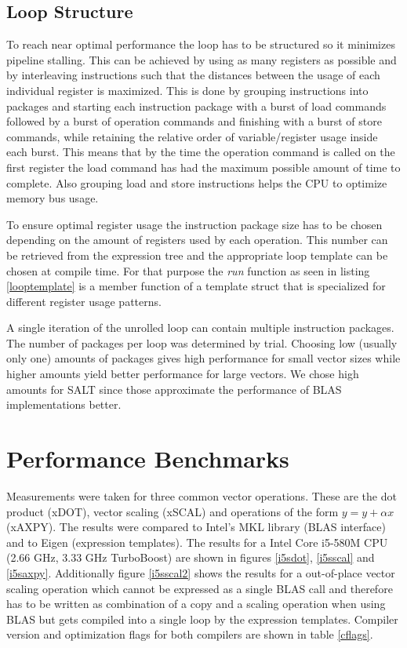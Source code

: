\documentclass[12pt]{article}
\begin{document}
\subsection{Loop Structure}
To reach near optimal performance the loop has to be structured so it minimizes
pipeline stalling. This can be achieved by using as many registers as possible
and by interleaving instructions such that the distances between the usage of
each individual register is maximized. This is done by grouping instructions into packages
and starting each instruction package with a burst of load commands followed by a burst of operation commands and
finishing with a burst of store commands, while retaining the relative order of
variable/register usage inside each burst. This means that by the time the
operation command is called on the first register the load command has had the maximum
possible amount of time to complete. Also grouping load and store instructions
helps the CPU to optimize memory bus usage.

To ensure optimal register usage the instruction package size has to be chosen depending
on the amount of registers used by each operation. This number can be retrieved
from the expression tree and the appropriate loop template can be chosen at compile
time. For that purpose the \emph{run} function as seen in listing \ref{looptemplate}
is a member function of a template struct that is specialized for different
register usage patterns.

A single iteration of the unrolled loop can contain multiple instruction packages.
The number of packages per loop was determined by trial. Choosing low (usually
only one) amounts of packages gives high performance for small vector sizes while
higher amounts yield better performance for large vectors. We chose high amounts for SALT
since those approximate the performance of BLAS implementations better.

\section{Performance Benchmarks}
Measurements were taken for three common vector operations. These are the dot product
(xDOT), vector scaling (xSCAL) and operations of the form $y = y + \alpha x$
(xAXPY). The results were compared to Intel's MKL library (BLAS interface) and
to Eigen (expression templates). The results for a Intel Core i5-580M CPU (2.66 GHz,
3.33 GHz TurboBoost) are shown in figures \ref{i5sdot}, \ref{i5sscal} and \ref{i5saxpy}.
Additionally figure \ref{i5sscal2} shows the results for a out-of-place vector
scaling operation which cannot be expressed as a single BLAS call and therefore
has to be written as combination of a copy and a scaling operation when using BLAS
but gets compiled into a single loop by the expression templates.
Compiler version and optimization flags for both compilers are shown in table \ref{cflags}.
\end{document}

